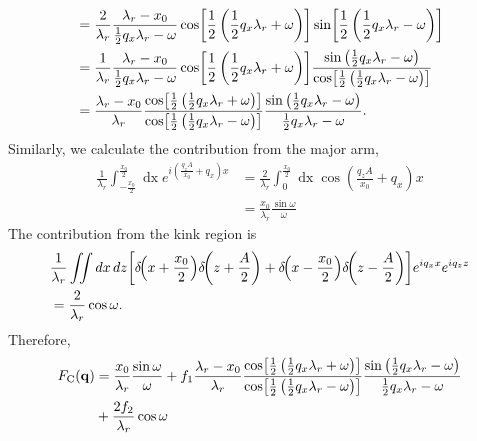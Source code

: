 \documentclass[12pt,letterpaper]{article}
\newcommand{\dx}{\mathop{dx}}
\newcommand{\dz}{\mathop{dz}}
\newcommand{\FC}{F_\mathrm{C}}
\begin{document}
\begin{align}
  &= \frac{2}{\lambda_r}\frac{\lambda_r-x_0}{\frac{1}{2}q_x\lambda_r - \omega} 
     \cos\mathopen{}\left[ \frac{1}{2}\left(\frac{1}{2}q_x\lambda_r + \omega\right) \right]\mathclose{} 
     \sin\mathopen{}\left[ \frac{1}{2}\left(\frac{1}{2}q_x\lambda_r - \omega\right) \right]\mathclose{} \nonumber\\
  &= \frac{1}{\lambda_r}\frac{\lambda_r-x_0}{\frac{1}{2}q_x\lambda_r - \omega} 
     \cos\mathopen{}\left[ \frac{1}{2}\left(\frac{1}{2}q_x\lambda_r + \omega\right) \right]\mathclose{} 
     \frac{\sin\left(\frac{1}{2}q_x\lambda_r - \omega \right)}
          {\cos\mathopen{}\left[ \frac{1}{2}\left(\frac{1}{2}q_x\lambda_r - \omega\right) \right]\mathclose{}} \nonumber\\
  &= \frac{\lambda_r-x_0}{\lambda_r}
     \frac{\cos\mathopen{}\left[ \frac{1}{2}\left(\frac{1}{2}q_x\lambda_r + \omega\right) \right]\mathclose{}}
          {\cos\mathopen{}\left[ \frac{1}{2}\left(\frac{1}{2}q_x\lambda_r - \omega\right) \right]\mathclose{}}
     \frac{\sin\left(\frac{1}{2}q_x\lambda_r - \omega\right)}
          {\frac{1}{2}q_x\lambda_r - \omega}.
\end{align}
Similarly, we calculate the contribution from the major arm,
\begin{align}
  \frac{1}{\lambda_r}\int_{-\frac{x_0}{2}}^{\frac{x_0}{2}}\dx 
  e^{i\left(\frac{q_zA}{x_0} + q_x \right)x}
  &= \frac{2}{\lambda_r}\int_{0}^{\frac{x_0}{2}}\dx \cos\left(\frac{q_zA}{x_0} + q_x\right)x \nonumber\\ 
  &= \frac{x_0}{\lambda_r}\frac{\sin\omega}{\omega}
\end{align}
The contribution from the kink region is 
\begin{align}
  & \frac{1}{\lambda_r}\iint\dx\dz
  \bracks{\delta\!\pars{x+\frac{x_0}{2}}\delta\!\pars{z+\frac{A}{2}} 
   + \delta\!\pars{x-\frac{x_0}{2}}\delta\!\pars{z-\frac{A}{2}}}
  e^{iq_xx} e^{iq_zz} \nonumber\\
  &= \frac{2}{\lambda_r}\cos\omega.
\end{align}
Therefore,
\begin{align}
  \FC(\mathbf{q}) 
  &= \frac{x_0}{\lambda_r}\frac{\sin\omega}{\omega} + 
  f_1\frac{\lambda_r-x_0}{\lambda_r}
  \frac{\cos\bracks{\frac{1}{2}\left(\frac{1}{2}q_x\lambda_r + \omega\right)}}
       {\cos\bracks{\frac{1}{2}\left(\frac{1}{2}q_x\lambda_r - \omega\right)}}
  \frac{\sin\left(\frac{1}{2}q_x\lambda_r - \omega\right)}
       {\frac{1}{2}q_x\lambda_r - \omega} \nonumber\\
  &+ \frac{2f_2}{\lambda_r}\cos\omega
\end{align}
\end{document}
